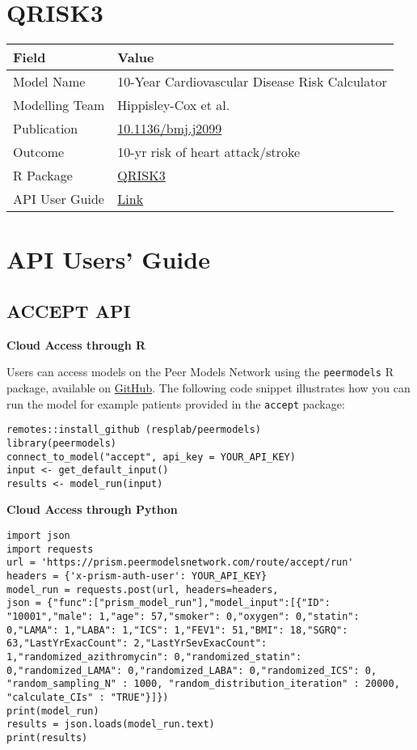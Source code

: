 \documentclass[
]{book}
\begin{document}
\hypertarget{qrisk3}{%
\chapter{QRISK3}\label{qrisk3}}

\begin{longtable}[]{@{}ll@{}}
\toprule
Field & Value\tabularnewline
\midrule
\endhead
Model Name & 10-Year Cardiovascular Disease Risk Calculator\tabularnewline
Modelling Team & Hippisley-Cox et al.\tabularnewline
Publication & \href{https://doi.org/10.1136/bmj.j2099}{10.1136/bmj.j2099}\tabularnewline
Outcome & 10-yr risk of heart attack/stroke\tabularnewline
R Package & \href{https://cran.r-project.org/package=QRISK3}{QRISK3}\tabularnewline
API User Guide & \href{https://resplab.github.io/prismguide/api-users-guide.html\#qrisk3}{Link}\tabularnewline
\bottomrule
\end{longtable}

\hypertarget{api-users-guide}{%
\chapter{API Users' Guide}\label{api-users-guide}}

\hypertarget{accept-api}{%
\section{ACCEPT API}\label{accept-api}}

\textbf{Cloud Access through R}

Users can access models on the Peer Models Network using the \texttt{peermodels} R package, available on \href{https://github.com/resplab/peermodels}{GitHub}. The following code snippet illustrates how you can run the model for example patients provided in the \texttt{accept} package:

\begin{verbatim}
remotes::install_github (resplab/peermodels)
library(peermodels)
connect_to_model("accept", api_key = YOUR_API_KEY)
input <- get_default_input()
results <- model_run(input)
\end{verbatim}

\textbf{Cloud Access through Python}

\begin{verbatim}
import json
import requests
url = 'https://prism.peermodelsnetwork.com/route/accept/run'
headers = {'x-prism-auth-user': YOUR_API_KEY}
model_run = requests.post(url, headers=headers,
json = {"func":["prism_model_run"],"model_input":[{"ID": "10001","male": 1,"age": 57,"smoker": 0,"oxygen": 0,"statin": 0,"LAMA": 1,"LABA": 1,"ICS": 1,"FEV1": 51,"BMI": 18,"SGRQ": 63,"LastYrExacCount": 2,"LastYrSevExacCount": 1,"randomized_azithromycin": 0,"randomized_statin": 0,"randomized_LAMA": 0,"randomized_LABA": 0,"randomized_ICS": 0, "random_sampling_N" : 1000, "random_distribution_iteration" : 20000, "calculate_CIs" : "TRUE"}]})
print(model_run)
results = json.loads(model_run.text)
print(results)
\end{verbatim}
\end{document}
